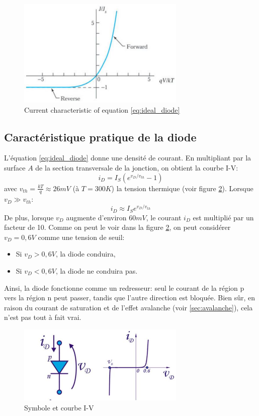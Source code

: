 \begin{figure}[h!]
\centering
\includegraphics[width=8cm]{figures/ch01/diode_charac.jpg}
\caption{Current characteristic of equation \ref{eq:ideal_diode}}
\label{fig:diode_charac}
\end{figure}

\subsection{Caractéristique pratique de la diode}
L'équation \ref{eq:ideal_diode} donne une densité de courant. En multipliant par la surface $A$ de la section transversale de la jonction, on obtient la courbe I-V:
\begin{equation}
	i_D = I_S(e^{v_D/v_{th}} - 1)
	\label{eq:idiode_IV}
\end{equation}
avec $v_{th} = \frac{kT}{q} \approx 26 mV$ (à $T=300K$) la tension thermique (voir figure \ref{fig:diode_charac2}). Lorsque $v_D \gg v_{th}$:
\begin{equation}
	i_D \approx I_S e^{v_D/v_{th}}
\end{equation}
De plus, lorsque $v_D$ augmente d'environ $60 mV$, le courant $i_D$ est multiplié par un facteur de 10. Comme on peut le voir dans la figure \ref{fig:diode_charac2}, on peut considérer $v_D = 0,6V$ comme une tension de seuil:
\begin{itemize}
	\item Si $v_D > 0,6V$, la diode conduira,
	\item Si $v_D < 0,6V$, la diode ne conduira pas.
\end{itemize}
Ainsi, la diode fonctionne comme un redresseur: seul le courant de la région p vers la région n peut passer, tandis que l'autre direction est bloquée. Bien sûr, en raison du courant de saturation et de l'effet avalanche (voir \ref{sec:avalanche}), cela n'est pas tout à fait vrai.

\begin{figure}[h!]
\centering
\includegraphics[width=8cm]{figures/ch01/diode_charac2.jpg}
\caption{Symbole et courbe I-V} 
\label{fig:diode_charac2}
\end{figure}

